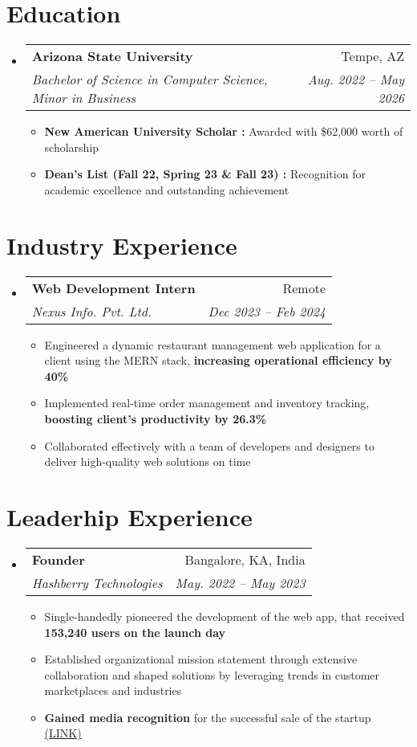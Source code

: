 \documentclass[letterpaper,11pt]{article}
\makeatletter
\newcommand{\resumeItem}[1]{
  \item\small{
    {#1 \vspace{-2pt}}
  }
}
\newcommand{\resumeSubheading}[4]{
  \vspace{-2pt}\item
    \begin{tabular*}{0.97\textwidth}[t]{l@{\extracolsep{\fill}}r}
      \textbf{#1} & #2 \\
      \textit{\small#3} & \textit{\small #4} \\
    \end{tabular*}\vspace{-7pt}
}
\newcommand{\resumeSubSubheading}[2]{
    \item
    \begin{tabular*}{0.97\textwidth}{l@{\extracolsep{\fill}}r}
      \textit{\small#1} & \textit{\small #2} \\
    \end{tabular*}\vspace{-7pt}
}
\newcommand{\resumeSubHeadingListStart}{\begin{itemize}[leftmargin=0.15in, label={}]}
\newcommand{\resumeSubHeadingListEnd}{\end{itemize}}
\newcommand{\resumeItemListStart}{\begin{itemize}}
\newcommand{\resumeItemListEnd}{\end{itemize}\vspace{-5pt}}
\makeatother
\begin{document}
\section{Education}
  \resumeSubHeadingListStart
    \resumeSubheading
      {Arizona State University}{Tempe, AZ}
      {Bachelor of Science in Computer Science, Minor in Business}{Aug. 2022 -- May 2026}
      \resumeItemListStart
        \resumeItem{\textbf{New American University Scholar :} Awarded with \$62,000 worth of scholarship}
        \resumeItem{\textbf{Dean’s List (Fall 22, Spring 23 \& Fall 23) :} Recognition for academic excellence and outstanding achievement}      
      \resumeItemListEnd
   
\resumeSubHeadingListEnd

\section{Industry Experience}
  \resumeSubHeadingListStart

    \resumeSubheading
      {Web Development Intern}{Remote}
      {Nexus Info. Pvt. Ltd.}{Dec 2023 -- Feb 2024}
      \resumeItemListStart
        \resumeItem{Engineered a dynamic restaurant management web application for a client using the MERN stack, \textbf{increasing operational efficiency by 40\%}}
        \resumeItem{Implemented real-time order management and inventory tracking,\textbf{ boosting client's productivity by 26.3\%}}
        \resumeItem{Collaborated effectively with a team of developers and designers to deliver high-quality web solutions on time}
      \resumeItemListEnd


      


  \resumeSubHeadingListEnd

\section{Leaderhip Experience}
  \resumeSubHeadingListStart
    \resumeSubheading
      {Founder}{Bangalore, KA, India}
      {Hashberry Technologies}{May. 2022 -- May 2023}
      \resumeItemListStart
        \resumeItem{Single-handedly pioneered the development of the web app, that received \textbf{153,240 users on the launch day}}
        \resumeItem{Established organizational mission statement through extensive collaboration and shaped solutions by leveraging trends in customer marketplaces and industries}
        \resumeItem{\textbf{Gained media recognition} for the successful sale of the startup 
\href{https://www.deccanherald.com/brandspot/sponsored/meet-the-crypto-boy-of-bengaluru-1221031.html}{(LINK)}}
      \resumeItemListEnd
\resumeSubHeadingListEnd
\end{document}
